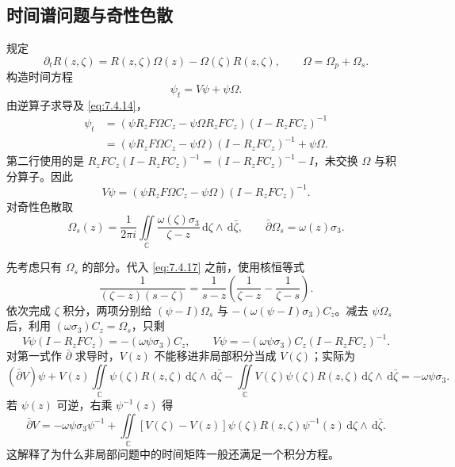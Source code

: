 \documentclass[lang=cn,scheme=chinese,mode=simple,device=normal,color=blue,math=cm,thmcnt=section,12pt]{elegantbook}
\newcommand{\dd}{\,\mathrm{d}}
\newcommand{\eqq}[2]{\tag{#1}\label{eq:#1}#2}
\begin{document}
\subsection{时间谱问题与奇性色散}
规定
\begin{equation}
\eqq{7.4.14}{\partial_tR(z,\zeta)=R(z,\zeta)\Omega(z)-\Omega(\zeta)R(z,\zeta),\qquad \Omega=\Omega_p+\Omega_s.}
\end{equation}
构造时间方程
\begin{equation}
\eqq{7.4.15}{\psi_t=V\psi+\psi\Omega.}
\end{equation}
由逆算子求导及 \eqref{eq:7.4.14}，
\begin{equation}
\eqq{7.4.16}{\begin{aligned}
\psi_t&=(\psi R_zF\Omega C_z-\psi\Omega R_zFC_z)(I-R_zFC_z)^{-1}\\
&=(\psi R_zF\Omega C_z-\psi\Omega)(I-R_zFC_z)^{-1}+\psi\Omega.
\end{aligned}}
\end{equation}
第二行使用的是 $R_zFC_z(I-R_zFC_z)^{-1}=(I-R_zFC_z)^{-1}-I$，未交换 $\Omega$ 与积分算子。因此
\begin{equation}
\eqq{7.4.17}{V\psi=(\psi R_zF\Omega C_z-\psi\Omega)(I-R_zFC_z)^{-1}.}
\end{equation}
对奇性色散取
\begin{equation}
\eqq{7.4.18}{\Omega_s(z)=\dfrac{1}{2\pi i}\iint\limits_{\mathbb C}\dfrac{\omega(\zeta)\sigma_3}{\zeta-z}\dd\zeta\wedge\dd\bar\zeta,
\qquad \bar\partial\Omega_s=\omega(z)\sigma_3.}
\end{equation}
\begin{callout}
先考虑只有 $\Omega_s$ 的部分。代入 \eqref{eq:7.4.17} 之前，使用核恒等式
\[
\dfrac{1}{(\zeta-z)(s-\zeta)}=\dfrac{1}{s-z}
\left(\dfrac{1}{\zeta-z}-\dfrac{1}{\zeta-s}\right).
\]
依次完成 $\zeta$ 积分，两项分别给
$(\psi-I)\Omega_s$ 与 $-(\omega(\psi-I)\sigma_3)C_z$。减去 $\psi\Omega_s$ 后，利用
$(\omega\sigma_3)C_z=\Omega_s$，只剩
\[
V\psi(I-R_zFC_z)=-(\omega\psi\sigma_3)C_z,
\qquad V\psi=-(\omega\psi\sigma_3)C_z(I-R_zFC_z)^{-1}.
\]
对第一式作 $\bar\partial$ 求导时，$V(z)$ 不能移进非局部积分当成 $V(\zeta)$；实际为
\[
(\bar\partial V)\psi+V(z)\iint\limits_{\mathbb C}\psi(\zeta)R(z,\zeta)\dd\zeta\wedge\dd\bar\zeta
-\iint\limits_{\mathbb C}V(\zeta)\psi(\zeta)R(z,\zeta)\dd\zeta\wedge\dd\bar\zeta
=-\omega\psi\sigma_3.
\]
若 $\psi(z)$ 可逆，右乘 $\psi^{-1}(z)$ 得
\[
\bar\partial V=-\omega\psi\sigma_3\psi^{-1}
+\iint\limits_{\mathbb C}[V(\zeta)-V(z)]\psi(\zeta)R(z,\zeta)\psi^{-1}(z)\dd\zeta\wedge\dd\bar\zeta.
\]
这解释了为什么非局部问题中的时间矩阵一般还满足一个积分方程。
\end{callout}
\end{document}
